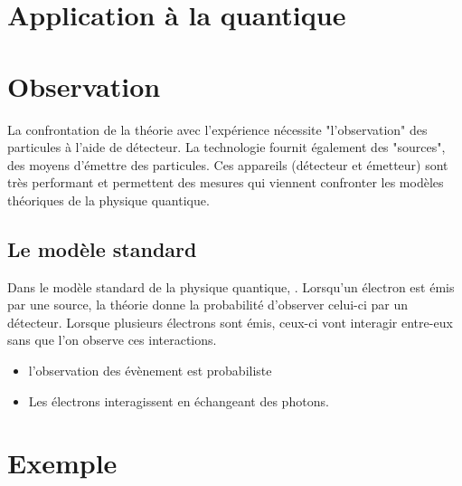 

\section{Application à la quantique}


\section{Observation}

La confrontation de la théorie avec l'expérience nécessite "l'observation" des particules à l'aide de détecteur. La technologie fournit également des "sources", des moyens d'émettre des particules. Ces appareils (détecteur et émetteur) sont très performant et permettent des mesures qui viennent confronter les modèles théoriques de la physique quantique.

\subsection{Le modèle standard}

Dans le modèle standard de la physique quantique, . Lorsqu'un électron est émis par une source, la théorie donne la probabilité d'observer celui-ci par un détecteur. Lorsque plusieurs électrons sont émis, ceux-ci vont interagir entre-eux sans que l'on observe ces interactions.

\begin{itemize}[leftmargin=1cm, label=, itemsep=1pt]
\item l'observation des évènement est probabiliste
\item Les électrons interagissent en échangeant des photons.
\end{itemize}

\section{Exemple}


